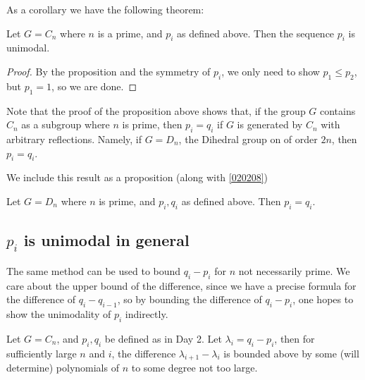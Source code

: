 \documentclass[12pt]{article}
\newcommand{\1}{\mathbb{I}}
\theoremstyle{definition}
\theoremstyle{definition}
\theoremstyle{definition}
\theoremstyle{definition}
\theoremstyle{definition}
\theoremstyle{definition}
\begin{document}
As a corollary we have the following theorem: 

\theorem Let $G = C_n$ where $n$ is a prime, and $p_i$ as defined above. Then the sequence $p_i$ is unimodal. 

\begin{proof}

By the proposition and the symmetry of $p_i$, we only need to show $p_1 \le p_2$, but $p_1 = 1$, so we are done.
\end{proof}


\remark Note that the proof of the proposition above shows that, if the group $G$ contains $C_n$ as a subgroup where $n$ is prime, then $p_i = q_i$ if $G$ is generated by $C_n$ with arbitrary reflections. Namely, if $G = D_n$, the Dihedral group on of order $2n$, then $p_i = q_i$.    

We include this result as a proposition (along with \ref{020208})

\proposition{\label{020214}}  Let $G = D_{n}$ where $n$ is prime, and $p_i, q_i$ as defined above. Then $p_i = q_i$. 



\subsection{$p_i$ is unimodal in general}


The same method can be used to bound $q_i - p_i$ for $n$ not necessarily prime.  We care about the upper bound of the difference, since we have a precise formula for the difference of $q_{i} - q_{i-1}$, so by bounding the difference of $q_i - p_i$, one hopes to show the unimodality of $p_i$ indirectly.


\lemma{\label{020602}} Let $G = C_n$, and $p_i, q_i$ be defined as in Day 2. Let $\lambda_i = q_i - p_i$, then for sufficiently large $n$ and $i$, the difference $\lambda_{i+1} - \lambda_{i}$ is bounded above by some (will determine) polynomials of $n$ to some degree not too large. \\
\end{document}
